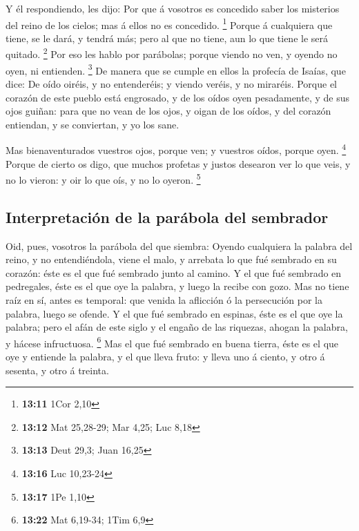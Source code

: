  Y él respondiendo, les dijo: Por que á vosotros es
concedido saber los misterios del reino de los cielos; mas á ellos no es
concedido. \footnote{\textbf{13:11} 1Cor 2,10}  Porque á
cualquiera que tiene, se le dará, y tendrá más; pero al que no tiene,
aun lo que tiene le será quitado. \footnote{\textbf{13:12} Mat 25,28-29;
  Mar 4,25; Luc 8,18}  Por eso les hablo por parábolas;
porque viendo no ven, y oyendo no oyen, ni entienden. \footnote{\textbf{13:13}
  Deut 29,3; Juan 16,25}  De manera que se cumple en ellos
la profecía de Isaías, que dice: De oído oiréis, y no entenderéis; y
viendo veréis, y no miraréis.  Porque el corazón de este
pueblo está engrosado, y de los oídos oyen pesadamente, y de sus ojos
guiñan: para que no vean de los ojos, y oigan de los oídos, y del
corazón entiendan, y se conviertan, y yo los sane.

 Mas bienaventurados vuestros ojos, porque ven; y vuestros
oídos, porque oyen. \footnote{\textbf{13:16} Luc 10,23-24} 
Porque de cierto os digo, que muchos profetas y justos desearon ver lo
que veis, y no lo vieron: y oir lo que oís, y no lo oyeron. \footnote{\textbf{13:17}
  1Pe 1,10}

\hypertarget{interpretaciuxf3n-de-la-paruxe1bola-del-sembrador}{%
\subsection{Interpretación de la parábola del
sembrador}\label{interpretaciuxf3n-de-la-paruxe1bola-del-sembrador}}

 Oid, pues, vosotros la parábola del que siembra:
 Oyendo cualquiera la palabra del reino, y no
entendiéndola, viene el malo, y arrebata lo que fué sembrado en su
corazón: éste es el que fué sembrado junto al camino.  Y el
que fué sembrado en pedregales, éste es el que oye la palabra, y luego
la recibe con gozo.  Mas no tiene raíz en sí, antes es
temporal: que venida la aflicción ó la persecución por la palabra, luego
se ofende.  Y el que fué sembrado en espinas, éste es el
que oye la palabra; pero el afán de este siglo y el engaño de las
riquezas, ahogan la palabra, y hácese infructuosa. \footnote{\textbf{13:22}
  Mat 6,19-34; 1Tim 6,9}  Mas el que fué sembrado en buena
tierra, éste es el que oye y entiende la palabra, y el que lleva fruto:
y lleva uno á ciento, y otro á sesenta, y otro á treinta.

